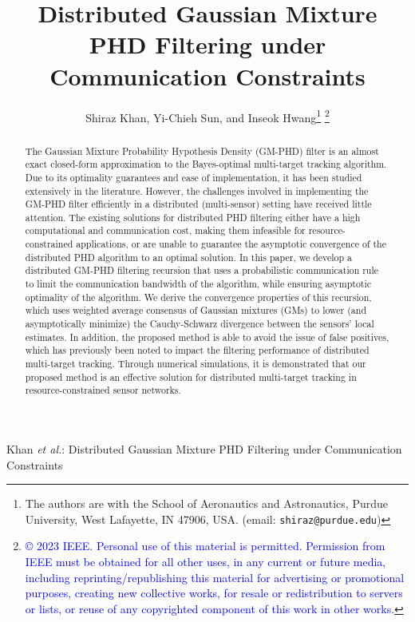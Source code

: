 \documentclass[lettersize,journal]{IEEEtran}
\begin{document}
\title{Distributed Gaussian Mixture PHD Filtering under Communication Constraints}

\author{Shiraz Khan, Yi-Chieh Sun, and Inseok Hwang\thanks{The authors are with the School of Aeronautics and Astronautics, Purdue University, West Lafayette, IN 47906, USA. (email: \texttt{shiraz@purdue.edu})}
\thanks{\textcolor{blue}{© 2023 IEEE. Personal use of this material is permitted. Permission from IEEE must be obtained for all other uses, in any current or future media, including reprinting/republishing this material for advertising or promotional purposes, creating new collective works, for resale or redistribution to servers or lists, or reuse of any copyrighted component of this work in other works.}}
}

%
{Khan \MakeLowercase{\textit{et al.}}: Distributed Gaussian Mixture PHD Filtering under Communication Constraints}


\maketitle

\begin{abstract}
The Gaussian Mixture Probability Hypothesis Density (GM-PHD) filter is an almost exact closed-form approximation to the Bayes-optimal multi-target tracking algorithm. Due to its optimality guarantees and ease of implementation, it has been studied extensively in the literature. However, the challenges involved in implementing the GM-PHD filter efficiently in a distributed (multi-sensor) setting have received little attention. The existing solutions for distributed PHD filtering either have a high computational and communication cost, making them infeasible for resource-constrained applications, or are unable to guarantee the asymptotic convergence of the distributed PHD algorithm to an optimal solution.     
In this paper, we develop a distributed GM-PHD filtering recursion that uses a probabilistic communication rule to limit the communication bandwidth of the algorithm, while ensuring asymptotic optimality of the algorithm. We derive the convergence properties of this recursion, which uses weighted average consensus of Gaussian mixtures (GMs) to lower (and asymptotically minimize) the Cauchy-Schwarz divergence between the sensors' local estimates. In addition, the proposed method is able to avoid the issue of false positives, which has previously been noted to impact the filtering performance of distributed multi-target tracking. Through numerical simulations, it is demonstrated that our proposed method is an effective solution for distributed multi-target tracking in resource-constrained sensor networks.
\end{abstract}
\end{document}
